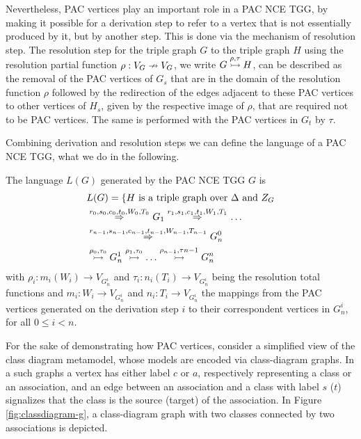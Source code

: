 \documentclass[a4paper,twoside]{article}
\begin{document}
Nevertheless, PAC vertices play an important role in a PAC NCE TGG, by making it possible for a derivation step to refer to a vertex that is not essentially produced by it, but by another step. This is done via the mechanism of resolution step. The resolution step for the triple graph $G$ to the triple graph $H$ using the resolution partial function $\rho: V_G \nrightarrow V_G$, we write $G \overset{\rho,\tau}{\rightarrowtail} H$, can be described as the removal of the PAC vertices of $G_s$ that are in the domain of the resolution function $\rho$ followed by the redirection of the edges adjacent to these PAC vertices to other vertices of $H_s$, given by the respective image of $\rho$, that are required not to be PAC vertices. The same is performed with the PAC vertices in $G_t$ by $\tau$.

Combining derivation and resolution steps we can define the language of a PAC NCE TGG, what we do in the following.

\begin{definition}
	The language $L(G)$ generated by the PAC NCE TGG $G$ is
	\begin{align*}
	& L(G) = \{ H \text{ is a triple graph over } \Delta \text{ and } Z_{G}\\
	& \overset{r_0,s_0,c_0,t_0,W_0,T_0}{\Rightarrow}_{} G_1 \overset{r_1,s_1,c_1,t_1,W_1,T_1}{\Rightarrow}_{} \dots \\
	& \overset{r_{n-1},s_{n-1},c_{n-1},t_{n-1},W_{n-1},T_{n-1}}{\Rightarrow}_{} G_n^0\\
	& \overset{\rho_0,\tau_0}{\rightarrowtail} G_n^1 \overset{\rho_1,\tau_0}{\rightarrowtail} \dots \overset{\rho_{n-1},\tau{n-1}}{\rightarrowtail} G_n^n
	\end{align*}
	with $\rho_i : m_i(W_i) \to V_{G_n^i}$ and $\tau_i : n_i(T_i) \to V_{G_n^i}$ being the resolution total functions and $m_i : W_i \to V_{G_n^i}$ and $n_i : T_i \to V_{G_n^i}$ the mappings from the PAC vertices generated on the derivation step $i$ to their correspondent vertices in $G_n^i$, for all $0 \le i < n$.
\end{definition}

For the sake of demonstrating how PAC vertices, consider a simplified view of the class diagram metamodel, whose models are encoded via class-diagram graphs. In a such graphs a vertex has either label $c$ or $a$, respectively representing a class or an association, and an edge between an association and a class with label $s$ ($t$) signalizes that the class is the source (target) of the association. In Figure \ref{fig:classdiagram-g}, a class-diagram graph with two classes connected by two associations is depicted. 
\end{document}
